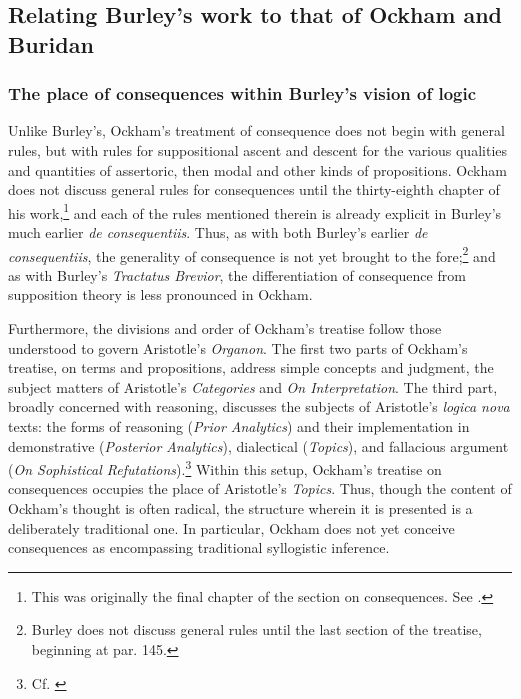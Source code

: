 \documentclass[]{birkjour}
\begin{document}


\subsection{Relating Burley's work to that of Ockham and Buridan}
\subsubsection{The place of consequences within Burley's vision of logic}
Unlike Burley's, Ockham's treatment of consequence does not begin with general rules, but with rules for suppositional ascent and descent for the various qualities and quantities of assertoric, then modal and other kinds of propositions. Ockham does not discuss general rules for consequences until the thirty-eighth chapter of his work,\footnote{This was originally the final chapter of the section on consequences. See \autocite[pp. 41*-43*]{OckhamSL}.} and each of the rules mentioned therein is already explicit in Burley's much earlier \textit{de consequentiis}. Thus, as with both Burley's earlier \textit{de consequentiis}, the generality of consequence is not yet brought to the fore;\footnote{Burley does not discuss general rules until the last section of the treatise, beginning at par. 145.} and as with Burley's \textit{Tractatus Brevior}, the differentiation of consequence from supposition theory is less pronounced in Ockham.

Furthermore, the divisions and order of Ockham's treatise follow those understood to govern Aristotle's \textit{Organon}. The first two parts of Ockham's treatise, on terms and propositions, address simple concepts and judgment, the subject matters of Aristotle's \textit{Categories} and \textit{On Interpretation}. The third part, broadly concerned with reasoning, discusses the subjects of Aristotle's \textit{logica nova} texts: the forms of reasoning (\textit{Prior Analytics}) and their implementation in demonstrative (\textit{Posterior Analytics}), dialectical (\textit{Topics}), and fallacious argument (\textit{On Sophistical Refutations}).\footnote{Cf. \autocite[prol.]{AquinasPA}} Within this setup, Ockham's treatise on consequences occupies the place of Aristotle's \textit{Topics}. Thus, though the content of Ockham's thought is often radical, the structure wherein it is presented is a deliberately traditional one. In particular, Ockham does not yet conceive consequences as encompassing traditional syllogistic inference.
\end{document}
